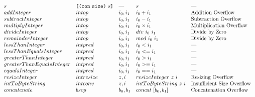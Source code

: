 \documentclass[../main.tex]{subfiles}
\begin{document}
\begin{figure*}[t]
\[\begin{array}{lllll}
        s     & \texttt{[} \texttt{(} \texttt{con} ~ \texttt{size} \texttt{)} ~ s \texttt{]}         &   \textrm{---}   &    s      &   \textrm{---}\\
        
        addInteger        &  intop  &  i_0 , i_1   &   i_0 + i_1         &   \textrm{Addition Overflow}       \\
        subtractInteger   &  intop  &  i_0 , i_1   &   i_0 - i_1         &   \textrm{Subtraction Overflow}    \\
        multiplyInteger   &  intop  &  i_0 , i_1   &   i_0 \times i_1    &   \textrm{Multiplication Overflow} \\
        divideInteger     &  intop  &  i_0 , i_1   &   div ~ i_0 ~ i_1   &   \textrm{Divide by Zero}          \\
        remainderInteger  &  intop  &  i_0 , i_1   &   mod ~ i_0 ~ i_1   &   \textrm{Divide by Zero}          \\
        
        lessThanInteger            &  intpred  &  i_0 , i_1   &   i_0 < i_1    &   \textrm{---}         \\
        lessThanEqualsInteger      &  intpred  &  i_0 , i_1   &   i_0 <= i_1   &   \textrm{---}         \\
        greaterThanInteger         &  intpred  &  i_0 , i_1   &   i_0 > i_1    &   \textrm{---}         \\
        greaterThanEqualsInteger   &  intpred  &  i_0 , i_1   &   i_0 >= i_1   &   \textrm{---}         \\
        equalsInteger              &  intpred  &  i_0 , i_1   &   i_0 == i_1   &   \textrm{---}         \\
        
        resizeInteger   &  intresize  &   z, i   &   resizeInteger ~ z ~ i   &   \textrm{Resizing Overflow} \\
        
        intToByteString  &   intconv  &  z, i           &   intToByteString ~ z ~ i   &   \textrm{Insufficient Size Overflow} \\
        
        
        concatenate   &   bsop   &   b_0 , b_1   & concat ~ [b_0,b_1]   &   \textrm{Concatenation Overflow} \\
        

\end{array}\]
\end{figure*}
\end{document}
